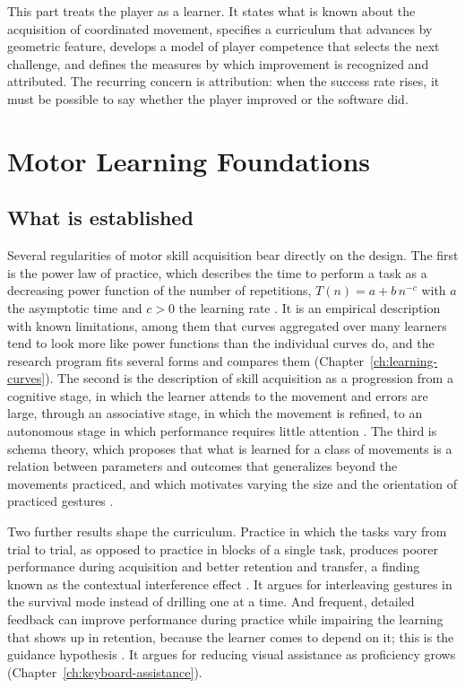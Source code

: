 This part treats the player as a learner. It states what is known about the acquisition of coordinated movement, specifies a curriculum that advances by geometric feature, develops a model of player competence that selects the next challenge, and defines the measures by which improvement is recognized and attributed. The recurring concern is attribution: when the success rate rises, it must be possible to say whether the player improved or the software did.

\chapter{Motor Learning Foundations}\label{ch:motor-learning}

\section{What is established}

Several regularities of motor skill acquisition bear directly on the design. The first is the power law of practice, which describes the time to perform a task as a decreasing power function of the number of repetitions, $T(n)=a+b\,n^{-c}$ with $a$ the asymptotic time and $c>0$ the learning rate \cite{newell1981}.\evD{} It is an empirical description with known limitations, among them that curves aggregated over many learners tend to look more like power functions than the individual curves do, and the research program fits several forms and compares them (Chapter~\ref{ch:learning-curves}). The second is the description of skill acquisition as a progression from a cognitive stage, in which the learner attends to the movement and errors are large, through an associative stage, in which the movement is refined, to an autonomous stage in which performance requires little attention \cite{fitts1967}.\evD{} The third is schema theory, which proposes that what is learned for a class of movements is a relation between parameters and outcomes that generalizes beyond the movements practiced, and which motivates varying the size and the orientation of practiced gestures \cite{schmidt1975}.\evD{}

Two further results shape the curriculum. Practice in which the tasks vary from trial to trial, as opposed to practice in blocks of a single task, produces poorer performance during acquisition and better retention and transfer, a finding known as the contextual interference effect \cite{shea1979}.\evD{} It argues for interleaving gestures in the survival mode instead of drilling one at a time. And frequent, detailed feedback can improve performance during practice while impairing the learning that shows up in retention, because the learner comes to depend on it; this is the guidance hypothesis \cite{salmoni1984}.\evD{} It argues for reducing visual assistance as proficiency grows (Chapter~\ref{ch:keyboard-assistance}).

